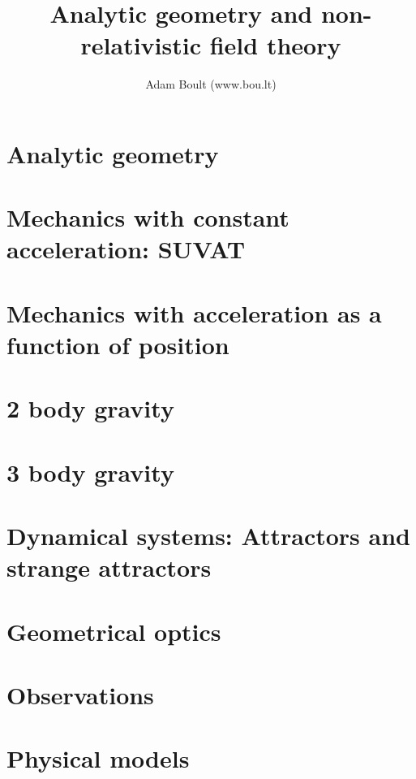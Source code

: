 \documentclass[oneside]{book}
\begin{document}
\author{Adam Boult (www.bou.lt)}
\title{Analytic geometry and non-relativistic field theory}
\maketitle

\setcounter{tocdepth}{0}
\tableofcontents



\part{Analytic geometry}







\part{Mechanics with constant acceleration: SUVAT}


\part{Mechanics with acceleration as a function of position}



\part{2 body gravity}


\part{3 body gravity}

\part{Dynamical systems: Attractors and strange attractors}

\part{Geometrical optics}

\part{Observations}

\part{Physical models}
\end{document}
